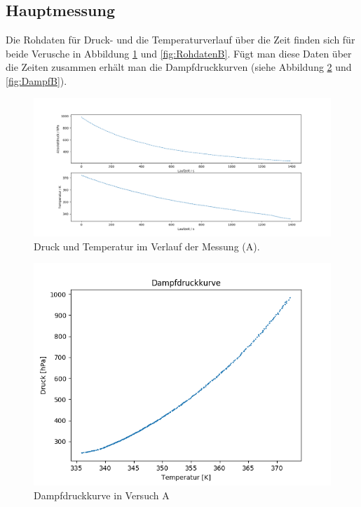 \documentclass[12pt,a4paper]{article}
\begin{document}
\subsection{Hauptmessung}


Die Rohdaten für Druck- und die Temperaturverlauf über die Zeit finden sich für beide Verusche in Abbildung \ref{fig:RohdatenA} und \ref{fig:RohdatenB}. Fügt man diese Daten über die Zeiten zusammen erhält man die Dampfdruckkurven (siehe Abbildung \ref{fig:DampfA} und \ref{fig:DampfB}).\\


\begin{figure}[H]
\includegraphics[width=\linewidth]{Bilder/Rohdaten_HauptmessungA.png}
\caption[Rohdaten A]{Druck und Temperatur im Verlauf der Messung (A).}
\label{fig:RohdatenA}
\end{figure}


\begin{figure}[H]
\includegraphics[scale=0.9]{Bilder/DampfdruckkurveA.png}
\caption[Dampfdruckkurve A]{Dampfdruckkurve in Versuch A}
\label{fig:DampfA}
\end{figure}
\end{document}
